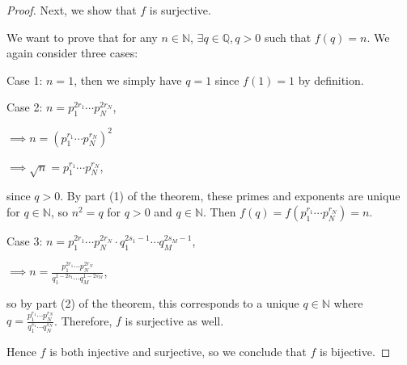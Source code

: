 \documentclass{article}
\begin{document}
\begin{proof}
	Next, we show that $f$ is surjective. 
	
	We want to prove that for any $n\in\mathbb{N}$, $\exists q \in \mathbb{Q}, q>0$ such that $f(q) = n$. We again consider three cases:
	
	Case 1: $n=1$, then we simply have $q=1$ since $f(1)=1$ by definition.
	
	Case 2: $n=p_1^{2r_1}\cdots p_N^{2r_N}$,
	
	$\implies n = \left(p_1^{r_1} \cdots p_N^{r_N}\right)^2$
	
	$\implies \sqrt{n} = p_1^{r_1} \cdots p_N^{r_N}$, 
	
	since $q>0$. By part (1) of the theorem, these primes and exponents are unique for $q\in\mathbb{N}$, so $n^2=q$ for $q>0$ and $q\in\mathbb{N}$. Then $f(q) = f(p_1^{r_1} \cdots p_N^{r_N}) = n$.
	
	Case 3: $n= p_1^{2r_1} \cdots p_N^{2r_N} \cdot q_1^{2s_1 - 1} \cdots q_M^{2s_M - 1}$,
	
	$\implies n = \frac{ p_1^{2r_1} \cdots p_N^{2r_N}}{q_1^{1 - 2s_1} \cdots q_M^{1 - 2s_M}}$,
	
	so by part (2) of the theorem, this corresponds to a unique $q\in\mathbb{N}$ where $q=\frac{p_1^{r_1}\cdots p_N^{r_N}}{q_1^{s_1}\cdots q_N^{s_N}}$. Therefore, $f$ is surjective as well. 
	
	Hence $f$ is both injective and surjective, so we conclude that $f$ is bijective.
\end{proof}
\end{document}

